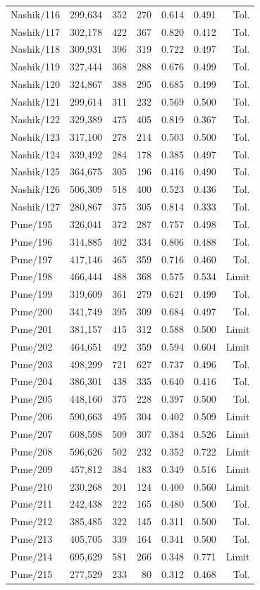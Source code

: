 \documentclass[11pt,a4paper,oneside]{report}
\begin{document}
\begin{center}
\begin{longtable}{lrrrrrr}
Nashik/116 & 299,634 & 352 & 270 & 0.614 & 0.491 & Tol.\\
Nashik/117 & 302,178 & 422 & 367 & 0.820 & 0.412 & Tol.\\
Nashik/118 & 309,931 & 396 & 319 & 0.722 & 0.497 & Tol.\\
Nashik/119 & 327,444 & 368 & 288 & 0.676 & 0.499 & Tol.\\
Nashik/120 & 324,867 & 388 & 295 & 0.685 & 0.499 & Tol.\\
Nashik/121 & 299,614 & 311 & 232 & 0.569 & 0.500 & Tol.\\
Nashik/122 & 329,389 & 475 & 405 & 0.819 & 0.367 & Tol.\\
Nashik/123 & 317,100 & 278 & 214 & 0.503 & 0.500 & Tol.\\
Nashik/124 & 339,492 & 284 & 178 & 0.385 & 0.497 & Tol.\\
Nashik/125 & 364,675 & 305 & 196 & 0.416 & 0.490 & Tol.\\
Nashik/126 & 506,309 & 518 & 400 & 0.523 & 0.436 & Tol.\\
Nashik/127 & 280,867 & 375 & 305 & 0.814 & 0.333 & Tol.\\
Pune/195 & 326,041 & 372 & 287 & 0.757 & 0.498 & Tol.\\
Pune/196 & 314,885 & 402 & 334 & 0.806 & 0.488 & Tol.\\
Pune/197 & 417,146 & 465 & 359 & 0.716 & 0.460 & Tol.\\
Pune/198 & 466,444 & 488 & 368 & 0.575 & 0.534 & Limit\\
Pune/199 & 319,609 & 361 & 279 & 0.621 & 0.499 & Tol.\\
Pune/200 & 341,749 & 395 & 309 & 0.684 & 0.497 & Tol.\\
Pune/201 & 381,157 & 415 & 312 & 0.588 & 0.500 & Limit\\
Pune/202 & 464,651 & 492 & 359 & 0.594 & 0.604 & Limit\\
Pune/203 & 498,299 & 721 & 627 & 0.737 & 0.496 & Tol.\\
Pune/204 & 386,301 & 438 & 335 & 0.640 & 0.416 & Tol.\\
Pune/205 & 448,160 & 375 & 228 & 0.397 & 0.500 & Tol.\\
Pune/206 & 590,663 & 495 & 304 & 0.402 & 0.509 & Limit\\
Pune/207 & 608,598 & 509 & 307 & 0.384 & 0.526 & Limit\\
Pune/208 & 596,626 & 502 & 232 & 0.352 & 0.722 & Limit\\
Pune/209 & 457,812 & 384 & 183 & 0.349 & 0.516 & Limit\\
Pune/210 & 230,268 & 201 & 124 & 0.400 & 0.560 & Limit\\
Pune/211 & 242,438 & 222 & 165 & 0.480 & 0.500 & Tol.\\
Pune/212 & 385,485 & 322 & 145 & 0.311 & 0.500 & Tol.\\
Pune/213 & 405,705 & 339 & 164 & 0.341 & 0.500 & Tol.\\
Pune/214 & 695,629 & 581 & 266 & 0.348 & 0.771 & Limit\\
Pune/215 & 277,529 & 233 & 80 & 0.312 & 0.468 & Tol.\\
\end{longtable}
\end{center}
\end{document}
